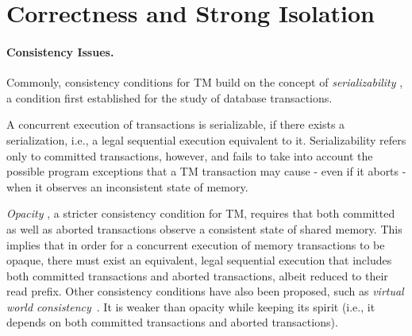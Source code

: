 \section{Correctness and Strong Isolation}
\label{sec:badthings}

\paragraph{Consistency Issues.}


Commonly, consistency conditions for TM build on the concept of 
{\it serializability} \cite{P79}, a condition first  established  for  the 
study  of  database  transactions.


A concurrent execution of transactions is serializable, 
if there exists a serialization, i.e., a legal sequential execution equivalent to it.
Serializability refers only to committed  transactions,  however, and fails to take into 
account the possible program exceptions that a TM transaction may cause - even if 
it aborts - when it observes an inconsistent state of memory.


{\it Opacity} \cite{guerraoui08}, a stricter consistency condition for TM, 
requires   that  both committed as well as aborted transactions  
observe a  consistent state  of shared memory.  This implies that  in order  for a
concurrent execution of memory transactions to be  
opaque,  there must exist  an equivalent,  legal sequential  execution that
includes both committed transactions and aborted  
transactions, albeit reduced to their read prefix.  Other consistency conditions 
have also been proposed, such as {\it virtual world consistency}~\cite{IR09}. It is weaker than 
opacity while keeping its spirit (i.e., it depends on both committed 
transactions and aborted transactions). 

